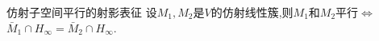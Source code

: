 \begin{theorem}{仿射子空间平行的射影表征}{}
	设$M_{1},M_{2}$是$V$的仿射线性簇,则$M_{1}$和$M_{2}$平行$\iff$ $\bar{M}_{1}\cap H_{\infty}=\bar{M}_{2}\cap H_{\infty}$.
\end{theorem}


































































